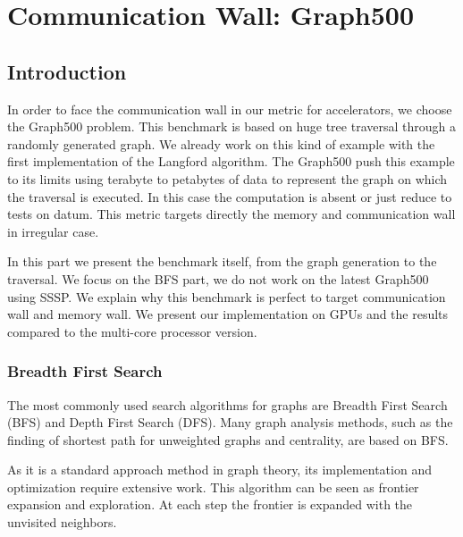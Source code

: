 
\chapter{Communication Wall: Graph500} 

\section{Introduction}
In order to face the communication wall in our metric for accelerators, we choose the Graph500 problem. 
This benchmark is based on huge tree traversal through a randomly generated graph. 
We already work on this kind of example with the first implementation of the Langford algorithm.
The Graph500 push this example to its limits using terabyte to petabytes of data to represent the graph on which the traversal is executed. 
In this case the computation is absent or just reduce to tests on datum.
This metric targets directly the memory and communication wall in irregular case. 

In this part we present the benchmark itself, from the graph generation to the traversal. 
We focus on the BFS part, we do not work on the latest Graph500 using SSSP. 
We explain why this benchmark is perfect to target communication wall and memory wall. 
We present our implementation on GPUs and the results compared to the multi-core processor version.

\subsection{Breadth First Search}
The most commonly used search algorithms for graphs are Breadth First Search (BFS) and Depth First Search (DFS).
Many graph analysis methods, such as the finding of shortest path for unweighted graphs and centrality, are based on BFS. 

As it is a standard approach method in graph theory, its implementation and optimization require extensive work. 
This algorithm can be seen as frontier expansion and exploration. 
At each step the frontier is expanded with the unvisited neighbors.  

